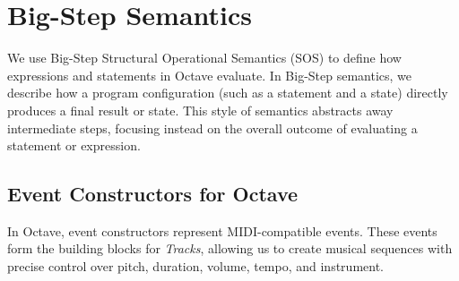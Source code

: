 \documentclass[letterpaper,12pt]{article}
\begin{document}
\section{Big-Step Semantics}

We use Big-Step Structural Operational Semantics (SOS) to define how expressions 
and statements in Octave evaluate. In Big-Step semantics, we describe how a program configuration (such as a statement and a state) directly produces a final result or state. This style of semantics abstracts away intermediate steps, focusing instead on the overall outcome of evaluating a statement or expression.

\subsection{Event Constructors for Octave} \label{event constructor}

In Octave, event constructors represent MIDI-compatible events. These events form the building blocks for \emph{Tracks}, allowing us to create musical sequences with precise control over pitch, duration, volume, tempo, and instrument.
\end{document}
